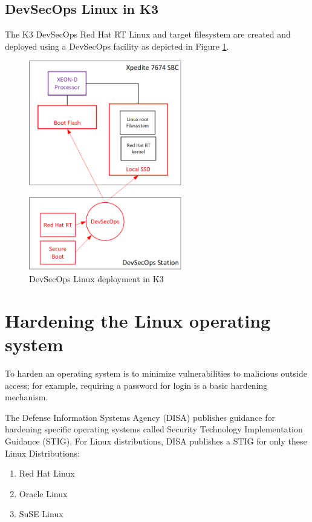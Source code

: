 \documentclass[12pt]{article}
\begin{document}
%
\subsection{DevSecOps Linux in K3}

The K3 DevSecOps Red Hat RT Linux and target filesystem are created and deployed
using a DevSecOps facility as depicted in Figure \ref{fig:dev_sec_ops}.

\begin{figure}[H]
    \begin{center}
    \includegraphics[width=0.6\textwidth]{img/dev_sec_ops}
    \caption{DevSecOps Linux deployment in K3}
    \label{fig:dev_sec_ops}
    \end{center}
\end{figure}




%
\newpage
\section{Hardening the Linux operating system}
\label{sec:image_hardening}

To harden an operating system is to minimize vulnerabilities to malicious
outside access; for example, requiring a password for login is a basic hardening
mechanism.

The Defense Information Systems Agency (DISA) publishes guidance for hardening
specific operating systems called Security Technology Implementation Guidance
(STIG).  For Linux distributions, DISA publishes a STIG for only these Linux
Distributions:
\begin{enumerate}
    \item Red Hat Linux
    \item Oracle Linux
    \item SuSE Linux
\end{enumerate}
\end{document}
